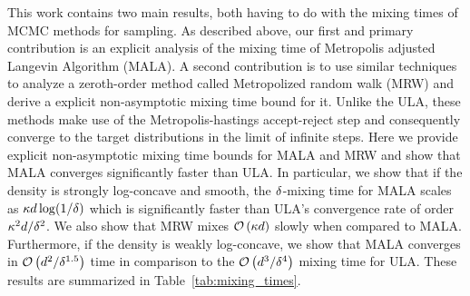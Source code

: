 \documentclass[final, 12pt]{colt2018} %
\begin{document}
This work contains two main results,
both having to do with the mixing times of MCMC methods for
sampling. As described above, our first and primary contribution is an
explicit analysis of the mixing time of Metropolis adjusted Langevin
Algorithm (MALA).  A second contribution is to use similar techniques
to analyze a zeroth-order method called Metropolized random walk
(MRW) and derive a explicit non-asymptotic mixing time bound for it.
Unlike the ULA, these methods make use of the
Metropolis-hastings accept-reject step and consequently converge to
the target distributions in the limit of infinite steps.  Here we
provide explicit non-asymptotic mixing time bounds for MALA and MRW
and show that MALA converges significantly faster than ULA.
In particular, we show that if the density is strongly log-concave and
smooth, the $\delta$-mixing time for MALA scales as $\kappa
d\log(1/\delta)$
which is significantly faster than ULA's convergence rate of order
$\kappa^2d/\delta^2$. We also show that
MRW mixes $\mathcal{O}\left( \kappa d \right)$ slowly when compared to MALA.
Furthermore, if the density is
weakly log-concave, we show that MALA converges in $\mathcal{O}\left( 
  d^2/\delta^{1.5}
 \right)$ time in comparison to the $\mathcal{O}\left( d^3/\delta^{4} \right)$
mixing time for ULA. These results are summarized in Table~\ref{tab:mixing_times}.
\end{document}
